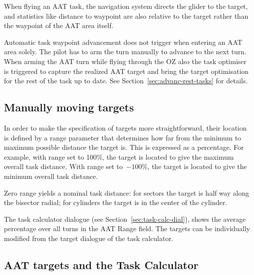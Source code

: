 When flying an AAT task, the navigation system directs the glider to
the target, and statistics like distance to waypoint are also relative
to the target rather than the waypoint of the AAT area itself.

Automatic task waypoint advancement does not trigger when entering an
AAT area solely. The pilot has to arm the turn manually to advance to the next
turn. When arming the AAT turn while flying through the OZ also the task
optimiser is triggered to capture the realized AAT target and bring the target
optimisation for the rest of the task up to date. See Section~\ref{sec:advanc-rest-tasks}
for details.

\subsection*{Manually moving targets}

In order to make the specification of targets more straightforward,
their location is defined by a range parameter that determines how
far from the minimum to maximum possible distance the target is.  This
is expressed as a percentage.  For example, with range set to 100\%,
the target is located to give the maximum overall task distance.  With
range set to~$-100$\%, the target is located to give the minimum overall
task distance.

Zero range yields a nominal task distance: for sectors the target is
half way along the bisector radial; for cylinders the target is in the
center of the cylinder.

The task calculator dialogue (see Section~\ref{sec:task-calc-dial}), shows the
average percentage over all turns in the AAT Range field.
The targets can be individually modified from the target dialogue of the task
calculator.


\subsection*{AAT targets and the Task Calculator}

